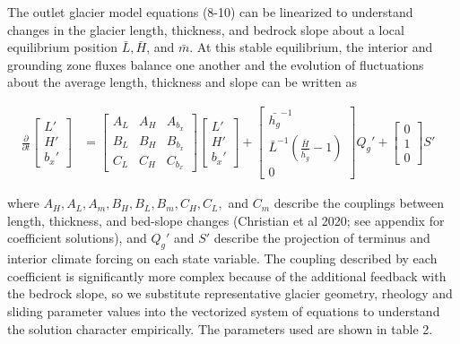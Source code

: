 \documentclass[tc, manuscript]{copernicus}
\begin{document}
The outlet glacier model equations (8-10)  can be linearized to understand changes in the glacier length, thickness, and bedrock slope about a local equilibrium position $\bar{L}, \bar{H}$, and $\bar{m}$. At this stable equilibrium, the interior and grounding zone fluxes balance one another and the evolution of fluctuations about the average length, thickness and slope can be written as

\begin{align}
\frac{\partial}{\partial t}
 \begin{bmatrix} L' \\ H' \\ b_x' \end{bmatrix}
 &=
  \begin{bmatrix}
   A_L & A_H & A_{b_x}  \\
   B_L & B_H& B_{b_x} \\
   C_L & C_H & C_{b_x}
   \end{bmatrix}
    \begin{bmatrix} L' \\ H' \\ b_x' \end{bmatrix}
    +
    \begin{bmatrix} \bar{h_g}^{-1} \\ \bar{L}^{-1}\left(\frac{\bar{H}}{\bar{h_g}}-1\right) \\ 0 \end{bmatrix} Q_g'
    + 
    \begin{bmatrix} 0 \\ 1 \\ 0 \end{bmatrix} S'&
\end{align}

where $A_H, A_L, A_m, B_H, B_L, B_m, C_H, C_L,$ and $C_m$ describe the couplings between length, thickness, and bed-slope changes (Christian et al 2020; see appendix for coefficient solutions), and $Q_g'$ and $S'$ describe the projection of terminus and interior climate forcing on each state variable. The coupling described by each coefficient is significantly more complex because of the additional feedback with the bedrock slope, so we substitute representative glacier geometry, rheology and sliding parameter values into the vectorized system of equations to understand the solution character empirically. The parameters used are shown in table 2.
\end{document}
